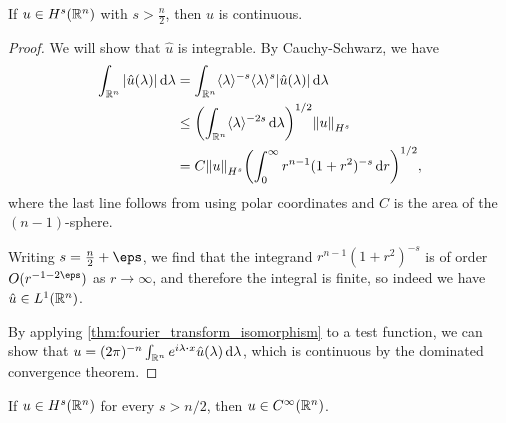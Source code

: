 
\begin{lemma}
	If $u \in H^s(\mathbb R^n)$ with $s > \frac n2$, then  $u$ is continuous. 
\end{lemma}

\begin{proof}
	We will show that $\hat u$ is integrable. By Cauchy-Schwarz, we have
	\begin{align*}
		\int_{\mathbb R^n} \abs{\hat u(\lambda)} \dd{\lambda} &= \int_{\mathbb R^n}  \langle\lambda\rangle^{-s} \langle\lambda\rangle^s \abs{\hat u(\lambda)} \dd{\lambda} \\
		&\leq \qty(\int_{\mathbb R^n}  \langle\lambda\rangle^{-2s}\dd{\lambda})^{1/2} \norm{u}_{H^s} \\
		&= C \norm{u}_{H^s} \qty(\int_0^\infty r^{n-1} (1 + r^2)^{-s} \dd{r})^{1/2}, 
	\end{align*}
where the last line follows from using polar coordinates and $C$ is the area of the $(n-1)$-sphere. 

Writing $s = \frac n2 + \eps$, we find that the integrand $r^{n-1}(1 + r^2)^{-s}$ is of order $O(r^{-1 - 2\eps})$ as $r \to\infty$, and therefore the integral is finite, so indeed we have $\hat u \in L^1(\mathbb R^n)$. 

By applying \cref{thm:fourier_transform_isomorphism} to a test function, we can show that $u = (2\pi)^{-n} \int_{\RR^n} e^{i\lambda \vd x} \hat u(\lambda) \dd{\lambda}$, which is continuous by the dominated convergence theorem. 
\end{proof}

\begin{corollary}
	If $u \in H^s(\mathbb R^n)$ for every $s > n/2$, then $u \in C^\infty(\mathbb R^n)$. 
\end{corollary}

